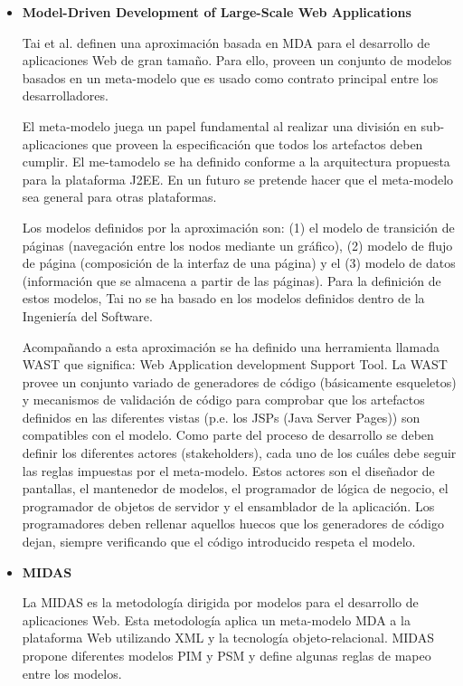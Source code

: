 \begin{itemize}

\item \textbf{Model-Driven Development of Large-Scale Web Applications}


Tai et al. \cite{Tail} definen una aproximación basada en MDA para el desarrollo de
aplicaciones Web de gran tamaño. Para ello, proveen un conjunto de modelos
basados en un meta-modelo que es usado como contrato principal entre los
desarrolladores.

El meta-modelo juega un papel fundamental al realizar una división en
sub-aplicaciones que proveen la especificación que todos los artefactos deben
cumplir. El me-tamodelo se ha definido conforme a la arquitectura propuesta para
la plataforma J2EE. En un futuro se pretende hacer que el meta-modelo sea general
para otras plataformas.

Los modelos definidos por la aproximación son: (1) el modelo de transición de
páginas (navegación entre los nodos mediante un gráfico), (2) modelo de flujo de
página (composición de la interfaz de una página) y el (3) modelo de datos
(información que se almacena a partir de las páginas). Para la definición de
estos modelos, Tai no se ha basado en los modelos definidos dentro de la
Ingeniería del Software.

Acompañando a esta aproximación se ha definido una herramienta llamada WAST que significa: Web Application development Support Tool. La WAST provee un conjunto variado de
generadores de código (básicamente esqueletos) y mecanismos de validación de
código para comprobar que los artefactos definidos en las diferentes vistas
(p.e. los JSPs (Java Server Pages)) son compatibles con el modelo.
Como parte del proceso de desarrollo se deben definir los diferentes actores
(stakeholders), cada uno de los cuáles debe seguir las reglas impuestas por el
meta-modelo. Estos actores son el diseñador de pantallas, el mantenedor de
modelos, el programador de lógica de negocio, el programador de objetos de
servidor y el ensamblador de la aplicación. Los programadores deben rellenar
aquellos huecos que los generadores de código dejan, siempre verificando que el
código introducido respeta el modelo.

\item \textbf{MIDAS} 

La MIDAS \cite{MIDAS} es la metodología dirigida por modelos para el desarrollo de aplicaciones
Web. Esta metodología aplica un meta-modelo MDA a la plataforma Web utilizando
XML y la tecnología objeto-relacional. MIDAS propone diferentes modelos PIM y PSM
y define algunas reglas de mapeo entre los modelos.


\end{itemize}
